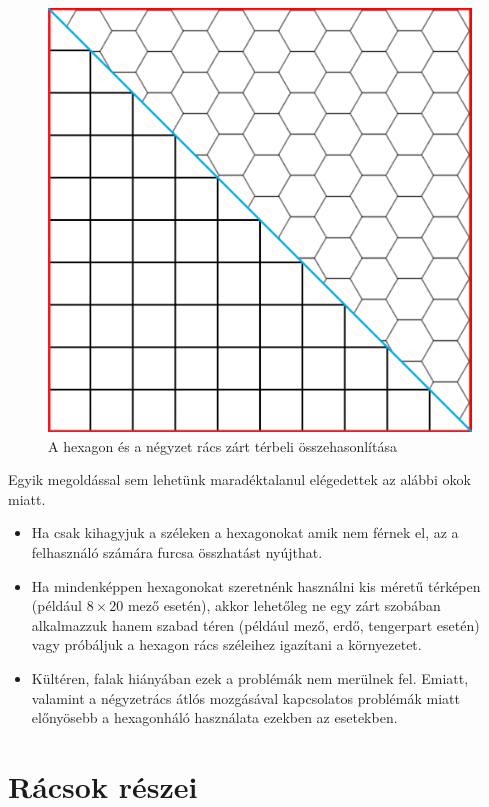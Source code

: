 \begin{figure}[h!]
\centering
\includegraphics[scale=0.1]{kepek/SqVsHex.png}
\caption{A hexagon és a négyzet rács zárt térbeli összehasonlítása}
\label{fig:SqVsHex}
\end{figure}

\noindent Egyik megoldással sem lehetünk maradéktalanul elégedettek az alábbi okok miatt.
\begin{itemize}
\item Ha csak kihagyjuk a széleken a hexagonokat amik nem férnek el, az a felhasználó számára furcsa összhatást nyújthat.
\item Ha mindenképpen hexagonokat szeretnénk használni kis méretű térképen (például $8 \times 20$ mező esetén), akkor lehetőleg ne egy zárt szobában alkalmazzuk hanem szabad téren (például mező, erdő, tengerpart esetén) vagy próbáljuk a hexagon rács széleihez igazítani a környezetet.
\item Kültéren, falak hiányában ezek a problémák nem merülnek fel. Emiatt, valamint a négyzetrács átlós mozgásával kapcsolatos problémák miatt előnyösebb a hexagonháló használata ezekben az esetekben.
\end{itemize}

\section{Rácsok részei}

